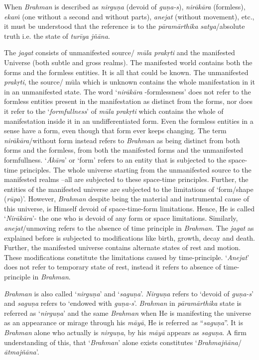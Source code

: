 When \emph{Brahman} is described as \emph{nirguṇa} (devoid of \emph{guṇa-s}), \emph{nirākāra} (formless), \emph{ekaṁ} (one without a second and without parts), \emph{anejat} (without movement), etc., it must be understood that the reference is to the \emph{pāramārthika} \emph{satya}/absolute truth i.e. the state of \emph{turīya}  \emph{jñāna}.

The \emph{jagat} consists of unmanifested source/ \emph{mūla prakṛti} and the manifested Universe (both subtle and gross realms). The manifested world contains both the forms and the formless entities. It is all that could be known. The unmanifested \emph{prakṛti}, the source/ mūla which is unknown contains the whole manifestation in it in an unmanifested state. The word `\emph{nirākāra} -formlessness' does not refer to the formless entities present in the manifestation as distinct from the forms, nor does it refer to the `\emph{formfullness}' of \emph{mūla} \emph{prakṛti} which contains the whole of manifestation inside it in an undifferentiated form. Even the formless entities in a sense have a form, even though that form ever keeps changing. The term \emph{nirākāra}/without form instead refers to \emph{Brahman} as being distinct from both forms and the formless, from both the manifested forms and the unmanifested formfullness. `\emph{Ākāra}' or `form' refers to an entity that is subjected to the space-time principles. The whole universe starting from the unmanifested source to the manifested realms --all are subjected to these space-time principles. Further, the entities of the manifested universe are subjected to the limitations of `form/shape (\emph{rūpa})'. However, \emph{Brahman} despite being the material and instrumental cause of this universe, is Himself devoid of space-time-form limitations. Hence, He is called `\emph{Nirākāra}'- the one who is devoid of any form or space limitations. Similarly, \emph{anejat}/unmoving refers to the absence of time principle in \emph{Brahman}. The \emph{jagat} as explained before is subjected to modifications like birth, growth, decay and death. Further, the manifested universe contains alternate states of rest and motion. These modifications constitute the limitations caused by time-principle. `\emph{Anejat}' does not refer to temporary state of rest, instead it refers to absence of time-principle in \emph{Brahman}.

\emph{Brahman} is also called `\emph{nirguṇa}' and `\emph{saguṇa}'. \emph{Nirguṇa} refers to `devoid of \emph{guṇa-s}' and \emph{saguṇa} refers to `endowed with \emph{guṇa-s}'. \emph{Brahman} in \emph{pāramārthika} state is referred as `\emph{nirguṇa}' and the same \emph{Brahman} when He is manifesting the universe as an appearance or mirage through his \emph{māyā}, He is referred as ``\emph{saguṇa}''. It is \emph{Brahman} alone who actually is \emph{nirguṇa}, by his \emph{māyā} appears as \emph{saguṇa}. A firm understanding of this, that `\emph{Brahman}' alone exists constitutes `\emph{Brahmajñāna}/\emph{ātmajñāna}'.


